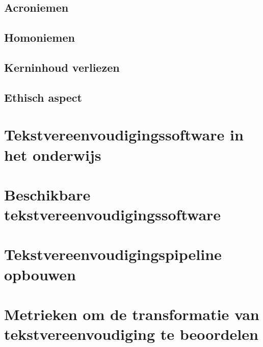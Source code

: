 \subsection{Acroniemen}

\subsection{Homoniemen}

\subsection{Kerninhoud verliezen}

\subsection{Ethisch aspect}

\cite{Gooding2022}

\section{Tekstvereenvoudigingssoftware in het onderwijs}

\section{Beschikbare tekstvereenvoudigingssoftware}

\section{Tekstvereenvoudigingspipeline opbouwen}

\section{Metrieken om de transformatie van tekstvereenvoudiging te beoordelen}





